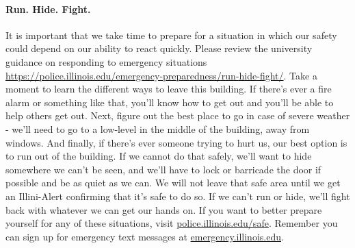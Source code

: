\documentclass[11pt, a4paper]{article}
\begin{document}
\paragraph{Run. Hide. Fight.}
It is important that we take time to prepare for a situation in which our
safety could depend on our ability to react quickly. Please review the
university guidance on responding to emergency situations
\url{https://police.illinois.edu/emergency-preparedness/run-hide-fight/}.
Take a moment to learn the different ways to leave
this building. If there’s ever a fire alarm or something like that, you’ll know
how to get out and you’ll be able to help others get out. Next, figure out the
best place to go in case of severe weather - we’ll need to go to a low-level in
the middle of the building, away from windows. And finally, if there’s ever
someone trying to hurt us, our best option is to run out of the building. If we
cannot do that safely, we’ll want to hide somewhere we can’t be seen, and we’ll
have to lock or barricade the door if possible and be as quiet as we can. We
will not leave that safe area until we get an Illini-Alert confirming that it’s
safe to do so. If we can’t run or hide, we’ll fight back with whatever we can
get our hands on. If you want to better prepare yourself for any of these
situations, visit \url{police.illinois.edu/safe}. Remember you can sign up for
emergency text messages at \url{emergency.illinois.edu}.
\end{document}
